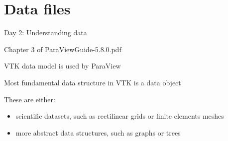 \documentclass{beamer}
\begin{document}
\section{Data files}

\begin{frame}{Day 2: Understanding data}
    
    Chapter 3 of ParaViewGuide-5.8.0.pdf
    
    \vskip 6pt
    
    VTK data model is used by ParaView
    
    \vskip 6pt
    
    Most fundamental data structure in VTK is a data object
    
    \vskip 6pt
    
    These are either:
    \begin{itemize}
        \item scientific datasets, such as rectilinear grids or finite elements meshes
        \item more abstract data structures, such as graphs or trees
    \end{itemize}{}
    
\end{frame}{}
\end{document}
